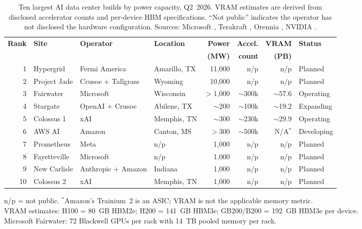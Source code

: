 \documentclass[12pt]{article}
\theoremstyle{definition}
\begin{document}
\begin{table}[H]
\centering
\caption{Ten largest AI data center builds by power capacity, Q2~2026. VRAM estimates are derived from disclosed accelerator counts and per-device HBM specifications. ``Not public'' indicates the operator has not disclosed the hardware configuration. Sources: Microsoft \cite{MSFairwater2025}, Terakraft \cite{Terakraft2026}, Orennia \cite{Orennia2026}, NVIDIA \cite{NVIDIASuperpod2024}.}
\label{tab:datacenters}
\small
\begin{tabular}{@{}rlllrrrl@{}}
\toprule
\textbf{Rank} & \textbf{Site} & \textbf{Operator} & \textbf{Location} & \textbf{Power} & \textbf{Accel.} & \textbf{VRAM} & \textbf{Status} \\
 & & & & \textbf{(MW)} & \textbf{count} & \textbf{(PB)} & \\
\midrule
1 & Hypergrid & Fermi America & Amarillo, TX & 11{,}000 & n/p & n/p & Planned \\
2 & Project Jade & Crusoe + Tallgrass & Wyoming & 10{,}000 & n/p & n/p & Planned \\
3 & Fairwater & Microsoft & Wisconsin & $>$1{,}000 & $\sim$300k & $\sim$57.6 & Operating \\
4 & Stargate & OpenAI + Crusoe & Abilene, TX & $\sim$200 & $\sim$100k & $\sim$19.2 & Expanding \\
5 & Colossus 1 & xAI & Memphis, TN & $\sim$300 & $\sim$230k & $\sim$29.9 & Operating \\
6 & AWS AI & Amazon & Canton, MS & $>$300 & $\sim$500k & N/A$^*$ & Developing \\
7 & Prometheus & Meta & n/p & 1{,}000 & n/p & n/p & Planned \\
8 & Fayetteville & Microsoft & n/p & 1{,}000 & n/p & n/p & Planned \\
9 & New Carlisle & Anthropic + Amazon & Indiana & 1{,}000 & n/p & n/p & Planned \\
10 & Colossus 2 & xAI & Memphis, TN & 1{,}000 & n/p & n/p & Planned \\
\bottomrule
\end{tabular}

\medskip
\footnotesize n/p = not public. $^*$Amazon's Trainium~2 is an ASIC; VRAM is not the applicable memory metric. \\
VRAM estimates: H100 = 80~GB HBM2e; H200 = 141~GB HBM3e; GB200/B200 = 192~GB HBM3e per device. \\
Microsoft Fairwater: 72 Blackwell GPUs per rack with 14~TB pooled memory per rack.
\end{table}
\end{document}
